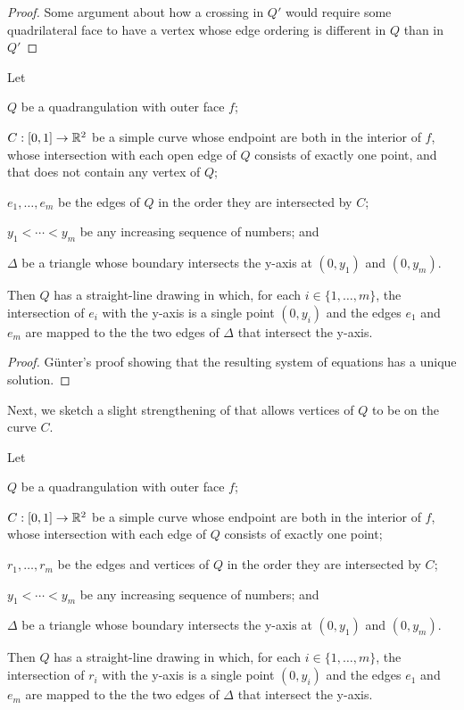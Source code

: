 \documentclass{patmorin}
\begin{document}
\begin{proof}
   Some argument about how a crossing in $Q'$ would require some
   quadrilateral face to have a vertex whose edge ordering is different
   in $Q$ than in $Q'$
\end{proof}

\begin{lem}
    Let
    \begin{compactitem}
    \item $Q$ be a quadrangulation with outer face $f$; 
    \item $C:[0,1]\to\mathbb{R}^2$ be a simple curve
     whose endpoint are both in the interior of $f$, 
     whose intersection with each open edge of $Q$
     consists of exactly one point, and that does not contain
     any vertex of $Q$; 
    \item $e_1,\ldots,e_m$ be the edges of $Q$ in the
    order they are intersected by $C$; 
    \item $y_1<\cdots<y_m$
    be any increasing sequence of numbers; and
    \item $\Delta$ be a triangle whose boundary intersects the y-axis
     at $(0,y_1)$ and $(0,y_m)$.
    \end{compactitem}
    Then $Q$ has a straight-line
    drawing in which, for each $i\in\{1,\ldots,m\}$, the intersection
    of $e_i$ with the y-axis is a single point $(0,y_i)$ and the edges
    $e_1$ and $e_m$ are mapped to the the two edges of $\Delta$ that
    intersect the y-axis.
\end{lem}

\begin{proof}
   G\"unter's proof showing that the resulting system of equations has a unique solution.
\end{proof}

Next, we sketch a slight strengthening of  that allows vertices of $Q$ to be on the curve $C$.

\begin{lem}
    Let
    \begin{compactitem}
    \item $Q$ be a quadrangulation with outer face $f$; 
    \item $C:[0,1]\to\mathbb{R}^2$ be a simple curve
     whose endpoint are both in the interior of $f$, 
     whose intersection with each edge of $Q$
     consists of exactly one point;
    \item $r_1,\ldots,r_m$ be the edges and vertices of $Q$ in the
    order they are intersected by $C$; 
    \item $y_1<\cdots<y_m$
    be any increasing sequence of numbers; and
    \item $\Delta$ be a triangle whose boundary intersects the y-axis
     at $(0,y_1)$ and $(0,y_m)$.
    \end{compactitem}
    Then $Q$ has a straight-line
    drawing in which, for each $i\in\{1,\ldots,m\}$, the intersection
    of $r_i$ with the y-axis is a single point $(0,y_i)$ and the edges
    $e_1$ and $e_m$ are mapped to the the two edges of $\Delta$ that
    intersect the y-axis.
\end{lem}
\end{document}
